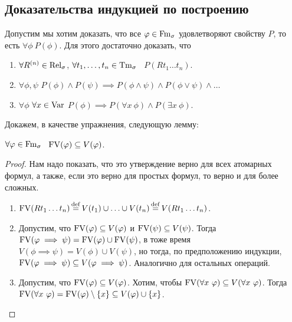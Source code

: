 \subsection{Доказательства индукцией по построению}
Допустим мы хотим доказать, что все $\varphi \in \mathrm{Fm}_{\sigma}$ удовлетворяют свойству $P$, то есть $\forall \phi~P(\phi)$.
Для этого достаточно доказать, что
\begin{enumerate}
    \item $\forall R^{(n)} \in \mathrm{Rel}_{\sigma}$, $\forall t_{1}, \ldots, t_{n} \in \mathrm{Tm}_{\sigma}$ \ $P(R t_{1} \ldots t_{n})$.
    \item $\forall \phi, \psi$ $P(\phi) \land P(\psi) \implies P(\phi \land \psi) \land P(\phi \lor \psi) \land \ldots$
    \item $\forall \phi$ $\forall x \in \mathrm{Var}$ $P(\phi) \implies P(\forall x~ \phi) \land P(\exists x~\phi)$.
\end{enumerate}
Докажем, в качестве упражнения, следующую лемму:
\begin{lemma}
    $\forall \varphi \in \mathrm{Fm}_{\sigma}$ \ $\mathrm{FV}(\varphi) \subseteq V(\varphi)$.
\end{lemma}
\begin{proof}
    Нам надо показать, что это утверждение верно для всех атомарных формул, а также, если это верно для простых формул, то верно и для более сложных.
    \begin{enumerate}
        \item $\mathrm{FV}(R t_{1} \ldots t_{n}) \operatorname{\overset{\mathrm{def}}{=}} V(t_{1}) \cup \ldots \cup V(t_{n}) \operatorname{\overset{\mathrm{def}}{=}} V(R t_{1} \ldots t_{n})$.
        \item Допустим, что $\mathrm{FV}(\varphi) \subseteq V(\varphi)$ и $\mathrm{FV}(\psi) \subseteq V(\psi)$.
        Тогда $\mathrm{FV}(\varphi \implies \psi) = \mathrm{FV}(\varphi) \cup \mathrm{FV}(\psi)$, в тоже время $V(\phi \implies \psi) = V(\phi) \cup V(\psi)$, но тогда, по предположению индукции, $\mathrm{FV}(\varphi \implies \psi) \subseteq V(\varphi \implies \psi)$.
        Аналогично для остальных операций.
        \item Допустим, что $\mathrm{FV}(\varphi) \subseteq V(\varphi)$.
        Хотим, чтобы $\mathrm{FV}(\forall x~\varphi) \subseteq V(\forall x~\varphi)$.
        Тогда $\mathrm{FV}(\forall x~\varphi) = \mathrm{FV}(\varphi) \setminus \{x\} \subseteq V(\varphi) \cup \{x\}$. \qedhere
    \end{enumerate}
\end{proof}

